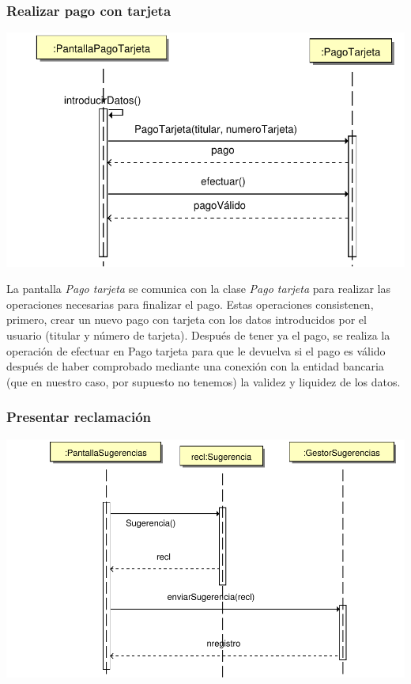 \documentclass[11pt, a4paper, twoside, titlepage]{article}
\begin{document}
			\subsubsection{Realizar pago con tarjeta}
				\begin{center}
					\includegraphics[scale=.7]{diseno/diagramas/pagotarjeta.pdf}
				\end{center}
				La pantalla {\itshape Pago tarjeta} se comunica con la clase {\itshape Pago tarjeta} para realizar las operaciones necesarias para finalizar el pago. Estas operaciones consistenen, primero, crear un nuevo pago con tarjeta con los datos introducidos por el usuario (titular y número de tarjeta). Después de tener ya el pago, se realiza la operación de efectuar en Pago tarjeta para que le devuelva si el pago es válido después de haber comprobado mediante una conexión con la entidad bancaria (que en nuestro caso, por supuesto no tenemos) la validez y liquidez de los datos.

			\subsubsection{Presentar reclamación}
				\begin{center}
					\includegraphics[scale=.7]{diseno/diagramas/presentarreclamacion.pdf}
				\end{center}
\end{document}
